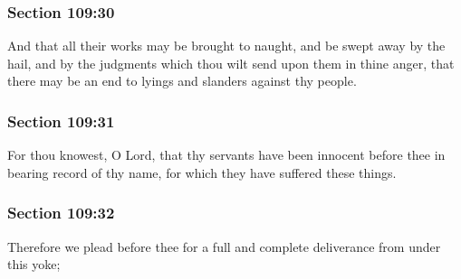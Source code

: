 	\subsubsection{Section 109:30} %
		\label{DC109-30}

		And that all their works may be brought to naught, and be swept away by the hail, and by the judgments which thou wilt send upon them in thine anger, that there may be an end to lyings and slanders against thy people.


	\subsubsection{Section 109:31} %
		\label{DC109-31}

		For thou knowest, O Lord, that thy servants have been innocent before thee in bearing record of thy name, for which they have suffered these things.


	\subsubsection{Section 109:32} %
		\label{DC109-32}

		Therefore we plead before thee for a full and complete deliverance from under this yoke;


